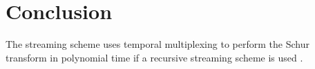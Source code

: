 \documentclass[12pt]{article}
\begin{document}
\section{Conclusion}

The streaming scheme uses temporal multiplexing to perform the Schur transform in polynomial time if a recursive streaming scheme is used \cite{bacon2007quantum}.





\newpage

\begin{landscape}

\end{landscape}

\end{document}
